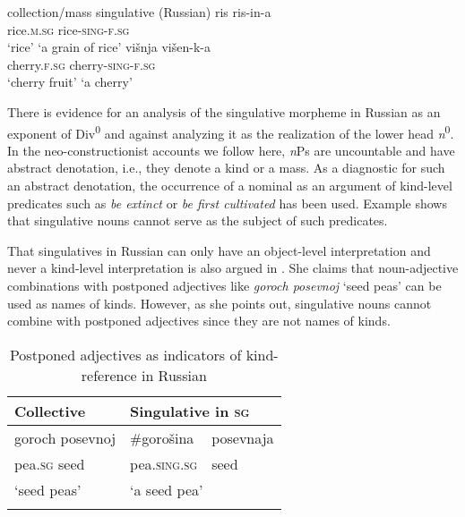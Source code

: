\documentclass[output=paper,colorlinks,citecolor=brown]{langscibook}
\begin{document}
\ea\label{ex:geist:24} \hspace{.5cm} collection/mass \phantom{I} singulative \hfill (Russian)
\ea\label{ex:geist:24a}
\gll  ris \phantom{XXXXi} ris-in-a \\
rice.\textsc{m.sg} {} rice-\textsc{sing-f.sg} \\ 
\glt `rice' \phantom{XXXXXXXi} `a grain of rice'
 \ex\label{ex:geist:24b}
\gll višnja \phantom{XXXi} višen-k-a \\
cherry.\textsc{f.sg} {} cherry-\textsc{sing-f.sg} \\
\glt `cherry fruit' \phantom{XXi} `a cherry'
\z\z

\noindent There is evidence for an analysis of the singulative morpheme in Russian as an exponent of Div\textsuperscript{0} and against analyzing it as the realization of the lower head \textit{n}\textsuperscript{0}. In the neo-constructionist accounts we follow here, \textit{n}Ps are uncountable and have abstract denotation, i.e., they denote a kind or a mass. As a diagnostic for such an abstract denotation, the occurrence of a nominal as an argument of kind-level predicates such as \textit{be extinct} or \textit{be first cultivated} has been used. Example  shows that singulative nouns cannot serve as the subject of such predicates.

\label{ex:geist:25}
\z

\noindent That singulatives in Russian can only have an object-level interpretation and never a kind-level interpretation is also argued in \citet[329]{Trugman2013}. She claims that noun-adjective combinations with postponed adjectives like \textit{goroch posevnoj} `seed peas' can be used as names of kinds. However, as she points out, singulative nouns cannot combine with postponed adjectives since they are not names of kinds. 

\begin{table}
\centering
\begin{tabular}{lll} 
\lsptoprule
Collective & \multicolumn{2}{l}{Singulative in \textsc{sg}} \\
\midrule
goroch posevnoj & \#gorošina & posevnaja \\ 
pea.\textsc{sg} seed & \phantom{\#}pea.\textsc{sing.sg} & seed \\ 
`seed peas' & \multicolumn{2}{l}{`a seed pea'} \\ 
\lspbottomrule
\end{tabular}
\caption{Postponed adjectives as indicators of kind-reference in Russian}
\label{tab:postponed_Rus}
\end{table}
\end{document}
